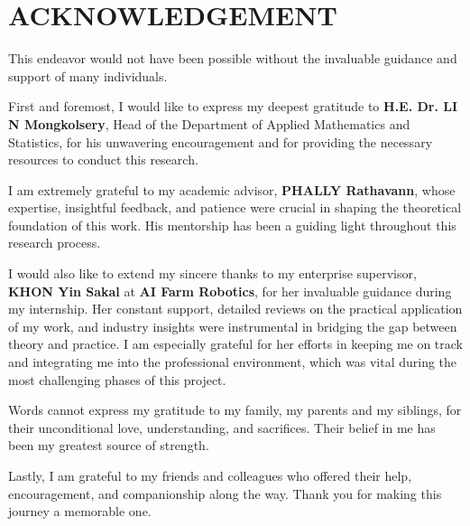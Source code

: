 \clearpage
{}
\chapter*{ACKNOWLEDGEMENT}

This endeavor would not have been possible without the invaluable guidance and support of many individuals.

First and foremost, I would like to express my deepest gratitude to \textbf{H.E. Dr. LI N Mongkolsery}, Head of the Department of Applied Mathematics and Statistics, for his unwavering encouragement and for providing the necessary resources to conduct this research.

I am extremely grateful to my academic advisor, \textbf{PHALLY Rathavann}, whose expertise, insightful feedback, and patience were crucial in shaping the theoretical foundation of this work. His mentorship has been a guiding light throughout this research process.

I would also like to extend my sincere thanks to my enterprise supervisor, \textbf{KHON Yin Sakal} at \textbf{AI Farm Robotics}, for her invaluable guidance during my internship. Her constant support, detailed reviews on the practical application of my work, and industry insights were instrumental in bridging the gap between theory and practice. I am especially grateful for her efforts in keeping me on track and integrating me into the professional environment, which was vital during the most challenging phases of this project.

Words cannot express my gratitude to my family, my parents and my siblings, for their unconditional love, understanding, and sacrifices. Their belief in me has been my greatest source of strength.

Lastly, I am grateful to my friends and colleagues who offered their help, encouragement, and companionship along the way. Thank you for making this journey a memorable one.